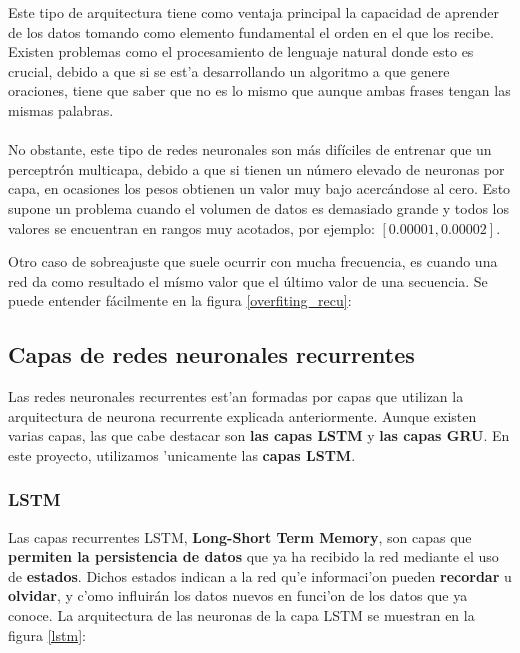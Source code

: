 Este tipo de arquitectura tiene como ventaja principal la capacidad de aprender de los datos tomando como elemento fundamental el orden en el que los recibe. Existen problemas como el procesamiento de lenguaje natural donde esto es crucial, debido a que si se est'a desarrollando un algoritmo a que genere oraciones, tiene que saber que no es lo mismo  que  aunque ambas frases tengan las mismas palabras.
\\
\\
No obstante, este tipo de redes neuronales son más difíciles de entrenar que un perceptrón multicapa, debido a que si tienen un número elevado de neuronas por capa, en ocasiones los pesos obtienen un valor muy bajo acercándose al cero. Esto supone un problema cuando el volumen de datos es demasiado grande y todos los valores se encuentran en rangos muy acotados, por ejemplo: $ [0.00001,0.00002 ] $.

Otro caso de sobreajuste que suele ocurrir con mucha frecuencia, es cuando una red da como resultado el mísmo valor que el último valor de una secuencia. Se puede entender fácilmente en la figura \ref{overfiting_recu}:


\clearpage


\subsection{Capas de redes neuronales recurrentes}

Las redes neuronales recurrentes est'an formadas por capas que utilizan la arquitectura de neurona recurrente explicada anteriormente. Aunque existen varias capas, las que cabe destacar son \textbf{las capas LSTM} y \textbf{las capas GRU}. En este proyecto, utilizamos 'unicamente las \textbf{capas LSTM}.

\subsubsection{LSTM}

Las capas recurrentes LSTM, \textbf{Long-Short Term Memory}, son capas que \textbf{permiten la persistencia de datos} que ya ha recibido la red mediante el uso de \textbf{estados}. Dichos estados indican a la red qu'e informaci'on pueden \textbf{recordar} u \textbf{olvidar}, y c'omo influirán los datos nuevos en funci'on de los datos que ya conoce.
La arquitectura de las neuronas de la capa LSTM se muestran en la figura \ref{lstm}:

